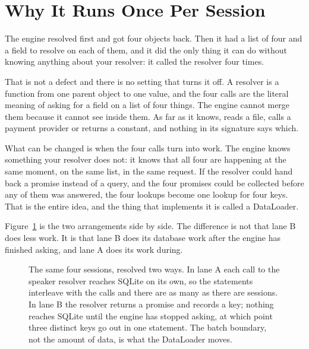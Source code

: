 \section{Why It Runs Once Per Session}
\label{sec:ch03-why-it-runs-once-per-session}

%
The engine resolved  first and got four objects back. Then it
had a list of four and a field to resolve on each of them, and it did the only
thing it can do without knowing anything about your resolver: it called the
resolver four times.

That is not a defect and there is no setting that turns it off. A resolver is a
function from one parent object to one value, and the four calls are the
literal meaning of asking for a field on a list of four things. The engine
cannot merge them because it cannot see inside them. As far as it knows,
 reads a file, calls a payment provider or returns a
constant, and nothing in its signature says which.

%
What can be changed is when the four calls turn into work. The engine knows
something your resolver does not: it knows that all four are happening at the
same moment, on the same list, in the same request. If the resolver could hand
back a promise instead of a query, and the four promises could be collected
before any of them was answered, the four lookups become one lookup for four
keys. That is the entire idea, and the thing that implements it is called a
DataLoader.

Figure~\ref{fig:ch03-one-batch} is the two arrangements side by side. The
difference is not that lane B does less work. It is that lane B does its
database work after the engine has finished asking, and lane A does its work
during.

\begin{figure}
  \centering
  
  \caption{The same four sessions, resolved two ways. In lane A each call to
  the speaker resolver reaches SQLite on its own, so the statements interleave
  with the calls and there are as many as there are sessions. In lane B the
  resolver returns a promise and records a key; nothing reaches SQLite until
  the engine has stopped asking, at which point three distinct keys go out in
  one statement. The batch boundary, not the amount of data, is what the
  DataLoader moves.}
  \label{fig:ch03-one-batch}
\end{figure}

